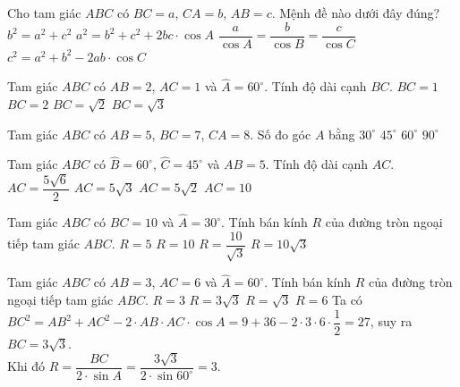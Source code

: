 \begin{ex}%
	Cho tam giác $ABC$ có $BC=a$, $CA=b$, $AB=c$. Mệnh đề nào dưới đây đúng?
	\choice
	{$b^2=a^2+c^2$}
	{$a^2=b^2+c^2+2 b c \cdot \cos A$}
	{$\dfrac{a}
	{\cos A}=\dfrac{b}{\cos B}=\dfrac{c}{\cos C}$}
	{\True$c^2=a^2+b^2-2 a b \cdot \cos C$}
\end{ex}
\begin{ex}%
	Tam giác $ABC$ có $AB=2$, $AC=1$ và $\widehat{A}=60^{\circ}$. Tính độ dài cạnh $BC$.
	\choice
	{$BC=1$}
	{$BC=2$}
	{$BC=\sqrt{2}$}
	{\True $BC=\sqrt{3}$}
\end{ex}
\begin{ex}%
	Tam giác ${ABC}$ có $AB=5$, $BC=7$, $CA=8$. Số đo góc $A$ bằng
	\choice
	{$30^{\circ}$}
	{$45^{\circ}$}
	{\True $60^{\circ}$}
	{$90^{\circ}$}
\end{ex}
\begin{ex}%
	Tam giác $ABC$ có $\widehat{B}=60^{\circ}$, $\widehat{C}=45^{\circ}$ và $AB=5$. Tính độ dài cạnh $AC$.
	\choice
	{\True $AC=\dfrac{5 \sqrt{6}}
	{2}$}
	{$AC=5 \sqrt{3}$}
	{$AC=5 \sqrt{2}$}
	{$AC=10$}
\end{ex}
\begin{ex}%
	Tam giác $ABC$ có $BC=10$ và $\widehat{A}=30^{\circ}$. Tính bán kính $R$ của đường tròn ngoại tiếp tam giác $ABC$.
	\choice
	{$R=5$}
	{\True $R=10$}
	{$R=\dfrac{10}
	{\sqrt{3}}$}
	{$R=10 \sqrt{3}$}
\end{ex}
\begin{ex}%
	Tam giác $ABC$ có $AB=3$, $AC=6$ và $\widehat{A}=60^{\circ} $. Tính bán kính $R$ của đường tròn ngoại tiếp tam giác $ABC$.
	\choice
	{\True $R=3$}
	{$R=3\sqrt{3}$}
	{$R=\sqrt{3}$}
	{$R=6$}
	\loigiai
	{Ta có $BC^2=AB^2+AC^2-2\cdot AB \cdot AC \cdot \cos A = 9+36- 2\cdot 3 \cdot 6 \cdot \dfrac{1}{2}=27$, suy ra $BC=3\sqrt{3}$.\\
	Khi đó $R=\dfrac{BC}{2\cdot \sin A}=\dfrac{3\sqrt{3}}{2\cdot \sin 60^{\circ}}=3$.}
\end{ex}
